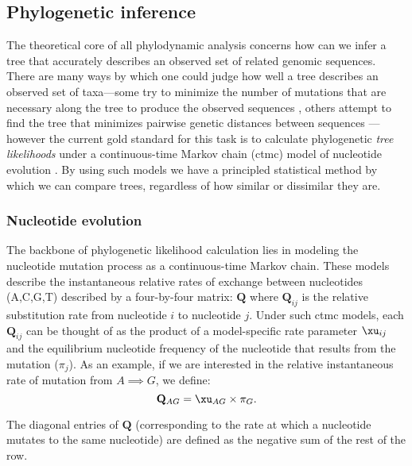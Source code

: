 \subsection{Phylogenetic inference}
The theoretical core of all phylodynamic analysis concerns how can we infer a tree that accurately describes an observed set of related genomic sequences.
There are many ways by which one could judge how well a tree describes an observed set of taxa---some try to minimize the number of mutations that are necessary along the tree to produce the observed sequences \citep{swofford1998phylogenetic}, others attempt to find the tree that minimizes pairwise genetic distances between sequences \citep{farris1972estimating}---however the current gold standard for this task is to calculate phylogenetic \textit{tree likelihoods} under a continuous-time Markov chain (\gls{ctmc}) model of nucleotide evolution \citep{felsenstein1981evolutionary}.
By using such models we have a principled statistical method by which we can compare trees, regardless of how similar or dissimilar they are.

\subsubsection{Nucleotide evolution}
The backbone of phylogenetic likelihood calculation lies in modeling the nucleotide mutation process as a continuous-time Markov chain.
These models describe the instantaneous relative rates of exchange between nucleotides (A,C,G,T) described by a four-by-four matrix: $\mathbf{Q}$ where $\mathbf{Q}_{ij}$ is the relative substitution rate from nucleotide $i$ to nucleotide $j$.
Under such \gls{ctmc} models, each $\mathbf{Q}_{ij}$ can be thought of as the product of a model-specific rate parameter $\xu_{ij}$ and the equilibrium nucleotide frequency of the nucleotide that results from the mutation ($\pi_j$).
As an example, if we are interested in the relative instantaneous rate of mutation from $A \implies G$, we define:
\begin{equation}
  \mathbf{Q}_{AG} = \xu_{AG} \times \pi_G.
\end{equation}

The diagonal entries of $\mathbf{Q}$ (corresponding to the rate at which a nucleotide mutates to the same nucleotide) are defined as the negative sum of the rest of the row.

